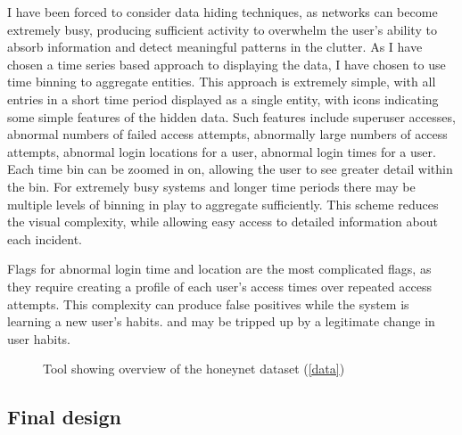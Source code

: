 I have been forced to consider data hiding techniques, as networks can become extremely busy, producing sufficient activity to overwhelm the user's ability to absorb information and detect meaningful patterns in the clutter. As I have chosen a time series based approach to displaying the data, I have chosen to use time binning to aggregate entities. This approach is extremely simple, with all entries in a short time period displayed as a single entity, with icons indicating some simple features of the hidden data. Such features include superuser accesses, abnormal numbers of failed access attempts, abnormally large numbers of access attempts, abnormal login locations for a user, abnormal login times for a user. Each time bin can be zoomed in on, allowing the user to see greater detail within the bin. For extremely busy systems and longer time periods there may be multiple levels of binning in play to aggregate sufficiently. This scheme reduces the visual complexity, while allowing easy access to detailed information about each incident. 

Flags for abnormal login time and location are the most complicated flags, as they require creating a profile of each user's access times over repeated access attempts. This complexity can produce false positives while the system is learning a new user's habits. and may be tripped up by a legitimate change in user habits.

\begin{figure}[tbh!]
\caption{\protect\label{overview}Tool showing overview of the honeynet dataset (\ref{data})}
\end{figure}

\subsection {Final design}\label{des_final}

